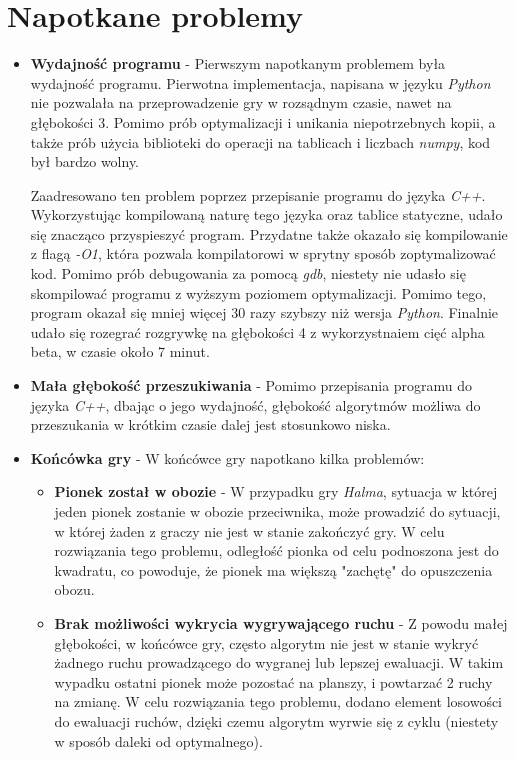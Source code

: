 \documentclass[a4paper, 12pt]{article}
\begin{document}
\section{Napotkane problemy}
\begin{itemize}
    \item \textbf{Wydajność programu} - Pierwszym napotkanym problemem była wydajność programu. 
Pierwotna implementacja, napisana w języku \textit{Python} nie pozwalała 
na przeprowadzenie gry w rozsądnym czasie, nawet na głębokości 3. Pomimo 
prób optymalizacji i unikania niepotrzebnych kopii, a także prób 
użycia biblioteki do operacji na tablicach i liczbach \textit{numpy}, kod był bardzo
wolny.

Zaadresowano ten problem poprzez przepisanie programu do języka \textit{C++}. 
Wykorzystując kompilowaną naturę tego języka oraz 
tablice statyczne, udało się znacząco przyspieszyć program. Przydatne także okazało się 
kompilowanie z flagą \textit{-O1}, która pozwala kompilatorowi w sprytny sposób zoptymalizować
kod. Pomimo prób debugowania za pomocą \textit{gdb}, niestety nie udasło się 
skompilować programu z wyższym poziomem optymalizacji. Pomimo tego, 
program okazał się mniej więcej 30 razy szybszy niż wersja \textit{Python}. Finalnie udało
się rozegrać rozgrywkę na głębokości 4 z wykorzystnaiem cięć alpha beta, w czasie około 7 minut.

    \item \textbf{Mała głębokość przeszukiwania} - Pomimo przepisania programu do języka \textit{C++},
dbając o jego wydajność, głębokość algorytmów możliwa do przeszukania w krótkim czasie dalej jest 
stosunkowo niska. 


    \item \textbf{Końcówka gry} - W końcówce gry napotkano kilka problemów:
    \begin{itemize}
        \item \textbf{Pionek został w obozie} - W przypadku gry \textit{Halma},
        sytuacja w której jeden pionek zostanie w obozie przeciwnika,
        może prowadzić do sytuacji, w której żaden z graczy nie jest w stanie
        zakończyć gry. W celu rozwiązania tego problemu, odległość 
        pionka od celu podnoszona jest do kwadratu, co powoduje, że
        pionek ma większą "zachętę" do opuszczenia obozu.
        \item \textbf{Brak możliwości wykrycia wygrywającego ruchu} - Z powodu małej głębokości,
        w końcówce gry, często algorytm nie jest w stanie wykryć żadnego ruchu prowadzącego
        do wygranej lub lepszej ewaluacji. W takim wypadku ostatni pionek może pozostać
        na planszy, i powtarzać 2 ruchy na zmianę. W celu rozwiązania tego problemu,
        dodano element losowości do ewaluacji ruchów, dzięki czemu algorytm wyrwie się z cyklu (niestety
        w sposób daleki od optymalnego).
    \end{itemize}

\end{itemize}
\end{document}
